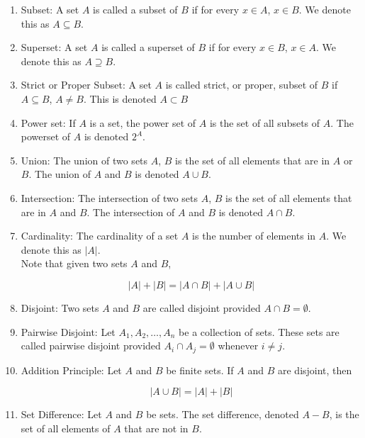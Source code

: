 \documentclass{article}
\begin{document}
\begin{enumerate}
    \item Subset: A set $A$ is called a subset of $B$ if for every $x\in A$, $x\in B$. We denote this as $A\subseteq B$. 
    
    \item Superset: A set $A$ is called a superset of $B$ if for every $x\in B$, $x\in A$. We denote this as $A\supseteq B$.
    
    \item Strict or Proper Subset: A set $A$ is called strict, or proper, subset of $B$ if $A \subseteq B$, $A\neq B$. This is denoted $A\subset B$ 
    
    \item Power set: If $A$ is a set, the power set of $A$ is the set of all subsets of $A$. The powerset of $A$ is denoted $2^A$.
    
    \item Union: The union of two sets $A$, $B$ is the set of all elements that are in $A$ or $B$. The union of $A$ and $B$ is denoted $A\cup B$.
    
    \item Intersection: The intersection of two sets $A$, $B$ is the set of all elements that are in $A$ and $B$. The intersection of $A$ and $B$ is denoted $A\cap B$.
    
    \item Cardinality: The cardinality of a set $A$ is the number of elements in $A$. We denote this as $|A|$.\\
    
    Note that given two sets $A$ and $B$, 
    
    \[|A|+|B|=|A\cap B|+|A\cup B|\]
    
    \item Disjoint: Two sets $A$ and $B$ are called disjoint provided $A\cap B=\emptyset$.
    
    \item Pairwise Disjoint: Let $A_1,A_2,\dots,A_n$ be a collection of sets. These sets are called pairwise disjoint provided $A_i\cap A_j=\emptyset$ whenever $i\neq j$.
    
    \item Addition Principle: Let $A$ and $B$ be finite sets. If $A$ and $B$ are disjoint, then 
    
    \[|A\cup B|=|A|+|B|\]
    
    \item Set Difference: Let $A$ and $B$ be sets. The set difference, denoted $A-B$, is the set of all elements of $A$ that are not in $B$.
    

\end{enumerate}
\end{document}
